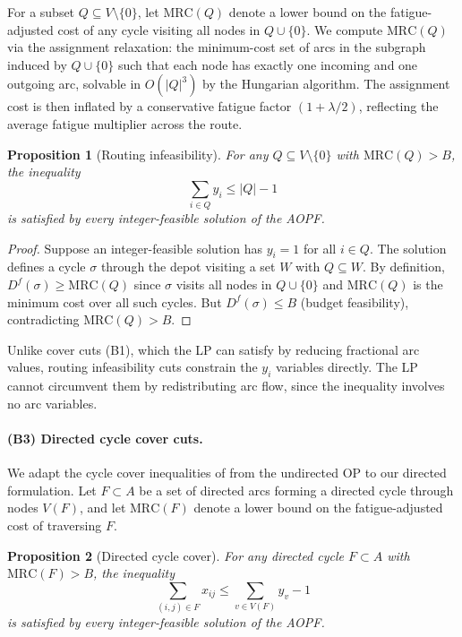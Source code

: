 \documentclass[preprint,11pt]{elsarticle}
\newtheorem{proposition}{Proposition}
\begin{document}
For a subset $Q \subseteq V \setminus \{0\}$, let $\text{MRC}(Q)$ denote a lower bound on the fatigue-adjusted cost of any cycle visiting all nodes in $Q \cup \{0\}$.
We compute $\text{MRC}(Q)$ via the assignment relaxation: the minimum-cost set of arcs in the subgraph induced by $Q \cup \{0\}$ such that each node has exactly one incoming and one outgoing arc, solvable in $O(|Q|^3)$ by the Hungarian algorithm.
The assignment cost is then inflated by a conservative fatigue factor $(1 + \lambda/2)$, reflecting the average fatigue multiplier across the route.

\begin{proposition}[Routing infeasibility]
\label{prop:routing}
For any $Q \subseteq V \setminus \{0\}$ with $\text{MRC}(Q) > B$, the inequality
\begin{equation}
  \sum_{i \in Q} y_i \leq |Q| - 1
  \label{eq:routing_infeasibility}
\end{equation}
is satisfied by every integer-feasible solution of the AOPF\@.
\end{proposition}

\begin{proof}
Suppose an integer-feasible solution has $y_i = 1$ for all $i \in Q$.
The solution defines a cycle $\sigma$ through the depot visiting a set $W$ with $Q \subseteq W$.
By definition, $D^f(\sigma) \geq \text{MRC}(Q)$ since $\sigma$ visits all nodes in $Q \cup \{0\}$ and $\text{MRC}(Q)$ is the minimum cost over all such cycles.
But $D^f(\sigma) \leq B$ (budget feasibility), contradicting $\text{MRC}(Q) > B$.
\end{proof}

Unlike cover cuts (B1), which the LP can satisfy by reducing fractional arc values, routing infeasibility cuts constrain the $y_i$ variables directly.
The LP cannot circumvent them by redistributing arc flow, since the inequality involves no arc variables.

\paragraph{(B3) Directed cycle cover cuts.}
We adapt the cycle cover inequalities of \citet{fischetti1998solving} from the undirected OP to our directed formulation.
Let $F \subset A$ be a set of directed arcs forming a directed cycle through nodes $V(F)$, and let $\text{MRC}(F)$ denote a lower bound on the fatigue-adjusted cost of traversing $F$.

\begin{proposition}[Directed cycle cover]
\label{prop:cyclecover}
For any directed cycle $F \subset A$ with $\text{MRC}(F) > B$, the inequality
\begin{equation}
  \sum_{(i,j) \in F} x_{ij} \leq \sum_{v \in V(F)} y_v - 1
  \label{eq:cycle_cover}
\end{equation}
is satisfied by every integer-feasible solution of the AOPF\@.
\end{proposition}
\end{document}
